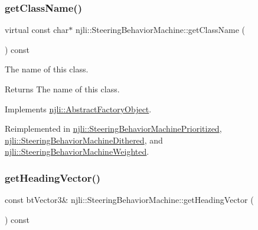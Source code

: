 \mbox{\label{classnjli_1_1_steering_behavior_machine_a62b8ba5c3e2b9f63eb146721c03d37a1}} 
\subsubsection{\texorpdfstring{get\+Class\+Name()}{getClassName()}}
{\footnotesize\ttfamily virtual const char$\ast$ njli\+::\+Steering\+Behavior\+Machine\+::get\+Class\+Name (\begin{DoxyParamCaption}{ }\end{DoxyParamCaption}) const\hspace{0.3cm}{\ttfamily [virtual]}}

The name of this class.

\begin{DoxyReturn}{Returns}
The name of this class. 
\end{DoxyReturn}


Implements \mbox{\hyperlink{classnjli_1_1_abstract_factory_object_af4151e41b80d5bc3fc42822c67fc2278}{njli\+::\+Abstract\+Factory\+Object}}.



Reimplemented in \mbox{\hyperlink{classnjli_1_1_steering_behavior_machine_prioritized_a0688707312da3b16368bbe4a8ed28462}{njli\+::\+Steering\+Behavior\+Machine\+Prioritized}}, \mbox{\hyperlink{classnjli_1_1_steering_behavior_machine_dithered_a3262e6d95dbb37c00fcc3436b1e48233}{njli\+::\+Steering\+Behavior\+Machine\+Dithered}}, and \mbox{\hyperlink{classnjli_1_1_steering_behavior_machine_weighted_a96746378cde3e401742eda55cbe5b23c}{njli\+::\+Steering\+Behavior\+Machine\+Weighted}}.

\mbox{\label{classnjli_1_1_steering_behavior_machine_aac2de411738725c7e4347097327da51e}} 
\subsubsection{\texorpdfstring{get\+Heading\+Vector()}{getHeadingVector()}}
{\footnotesize\ttfamily const bt\+Vector3\& njli\+::\+Steering\+Behavior\+Machine\+::get\+Heading\+Vector (\begin{DoxyParamCaption}{ }\end{DoxyParamCaption}) const}

